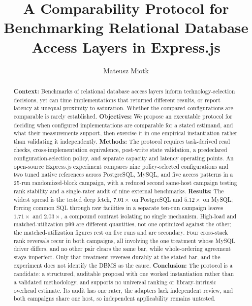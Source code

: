 \documentclass[review]{elsarticle}
\begin{document}
\begin{frontmatter}

\title{A Comparability Protocol for Benchmarking Relational Database
  Access Layers in Express.js}

\author[ug]{Mateusz Miotk}

\begin{abstract}
\textbf{Context:} Benchmarks of relational database access layers inform technology-selection
decisions, yet can time implementations that returned different results, or report latency at unequal
proximity to saturation. Whether the compared configurations are comparable is rarely established.
\textbf{Objectives:} We propose an executable protocol for deciding when configured implementations
are comparable for a stated estimand, and what their measurements support, then exercise it in one
empirical instantiation rather than validating it independently.
\textbf{Methods:} The protocol requires task-derived read checks, cross-implementation equivalence,
post-write state validation, a predeclared configuration-selection policy, and separate capacity and
latency operating points. An open-source Express.js experiment compares nine policy-selected configurations
and two tuned native references across PostgreSQL, MySQL, and five access patterns in a 25-run
randomized-block campaign, with a reduced second same-host campaign testing rank stability and a
single-rater audit of nine external benchmarks.
\textbf{Results:} The widest spread is the tested deep fetch, $7.01\times$ on PostgreSQL and
$5.12\times$ on MySQL; forcing common SQL through raw facilities in a separate ten-run campaign
leaves $1.71\times$ and
$2.03\times$, a compound contrast isolating no single mechanism. High-load and matched-utilization p99 are different
quantities, not one optimized against the other; the matched-utilization figures rest on five runs
and are secondary. Four cross-stack rank reversals recur in both campaigns, all
involving the one treatment whose MySQL driver differs, and no other pair clears the same bar,
while whole-ordering agreement stays imperfect. Only that treatment reverses durably at the
stated bar, and the experiment does not identify the DBMS as the cause.
\textbf{Conclusion:} The protocol is a candidate: a structured, auditable proposal with one worked
instantiation rather than a validated methodology, and supports no universal ranking or library-intrinsic overhead estimate.
Its audit has one rater, the adapters lack independent review, and both campaigns share one host, so
independent applicability remains untested.
\end{abstract}


\end{frontmatter}
\end{document}
